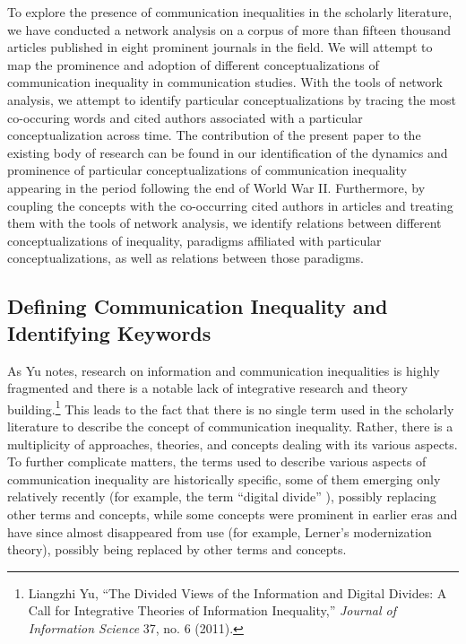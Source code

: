 \documentclass{tufte-handout}
\begin{document}
To explore the presence of communication inequalities in the scholarly
literature, we have conducted a network analysis on a corpus of more
than fifteen thousand articles published in eight prominent journals in
the field. We will attempt to map the prominence and adoption of
different conceptualizations of communication inequality in
communication studies. With the tools of network analysis, we attempt to
identify particular conceptualizations by tracing the most co-occuring
words and cited authors associated with a particular conceptualization
across time. The contribution of the present paper to the existing body
of research can be found in our identification of the dynamics and
prominence of particular conceptualizations of communication inequality
appearing in the period following the end of World War II. Furthermore,
by coupling the concepts with the co-occurring cited authors in articles
and treating them with the tools of network analysis, we identify
relations between different conceptualizations of inequality, paradigms
affiliated with particular conceptualizations, as well as relations
between those paradigms.

\hypertarget{defining-communication-inequality-and-identifying-keywords}{%
\subsection{Defining Communication Inequality and
Identifying
Keywords}\label{defining-communication-inequality-and-identifying-keywords}}

As Yu notes, research on information and communication inequalities is
highly fragmented and there is a notable lack of integrative research
and theory building.\footnote{Liangzhi Yu, ``The Divided Views of the
  Information and Digital Divides: A Call for Integrative Theories of
  Information Inequality,'' \emph{Journal of Information Science} 37,
  no. 6 (2011).} This leads to the fact that there is no single term
used in the scholarly literature to describe the concept of
communication inequality. Rather, there is a multiplicity of approaches,
theories, and concepts dealing with its various aspects. To further
complicate matters, the terms used to describe various aspects of
communication inequality are historically specific, some of them
emerging only relatively recently (for example, the term ``digital
divide'' ), possibly replacing other terms and concepts, while some
concepts were prominent in earlier eras and have since almost
disappeared from use (for example, Lerner's modernization theory),
possibly being replaced by other terms and concepts.
\end{document}
